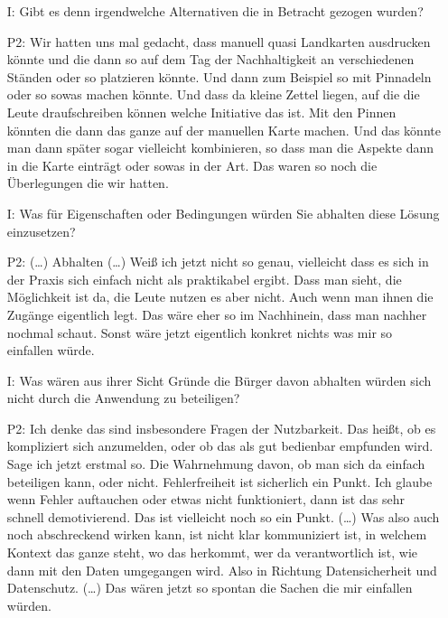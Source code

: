 \begin{itemize}
    \item[I:] Gibt es denn irgendwelche Alternativen die in Betracht gezogen wurden?
    \item[P2:] Wir hatten uns mal gedacht, dass manuell quasi Landkarten ausdrucken k{\"o}nnte und die dann so auf dem Tag der Nachhaltigkeit an verschiedenen St{\"a}nden oder so platzieren k{\"o}nnte. Und dann zum Beispiel so mit Pinnadeln oder so sowas machen k{\"o}nnte. Und dass da kleine Zettel liegen, auf die die Leute draufschreiben k{\"o}nnen welche Initiative das ist. Mit den Pinnen k{\"o}nnten die dann das ganze auf der manuellen Karte machen. Und das k{\"o}nnte man dann sp{\"a}ter sogar vielleicht kombinieren, so dass man die Aspekte dann in die Karte eintr{\"a}gt oder sowas in der Art. Das waren so noch die {\"U}berlegungen die wir hatten.
    \item[I:] Was f{\"u}r Eigenschaften oder Bedingungen w{\"u}rden Sie abhalten diese L{\"o}sung einzusetzen?
    \item[P2:] (\dots) Abhalten (\dots) Wei{\ss} ich jetzt nicht so genau, vielleicht dass es sich in der Praxis sich einfach nicht als praktikabel ergibt. Dass man sieht, die M{\"o}glichkeit ist da, die Leute nutzen es aber nicht. Auch wenn man ihnen die Zug{\"a}nge eigentlich legt. Das w{\"a}re eher so im Nachhinein, dass man nachher nochmal schaut. Sonst w{\"a}re jetzt eigentlich konkret nichts was mir so einfallen w{\"u}rde.
    \item[I:] Was w{\"a}ren aus ihrer Sicht Gr{\"u}nde die B{\"u}rger davon abhalten w{\"u}rden sich nicht durch die Anwendung zu beteiligen?
    \item[P2:] Ich denke das sind insbesondere Fragen der Nutzbarkeit. Das hei{\ss}t, ob es kompliziert sich anzumelden, oder ob das als gut bedienbar empfunden wird. Sage ich jetzt erstmal so. Die Wahrnehmung davon, ob man sich da einfach beteiligen kann, oder nicht. Fehlerfreiheit ist sicherlich ein Punkt. Ich glaube wenn Fehler auftauchen oder etwas nicht funktioniert, dann ist das sehr schnell demotivierend. Das ist vielleicht noch so ein Punkt. (\dots) Was also auch noch abschreckend wirken kann, ist nicht klar kommuniziert ist, in welchem Kontext das ganze steht, wo das herkommt, wer da verantwortlich ist, wie dann mit den Daten umgegangen wird. Also in Richtung Datensicherheit und Datenschutz. (\dots) Das w{\"a}ren jetzt so spontan die Sachen die mir einfallen w{\"u}rden.
\end{itemize}

